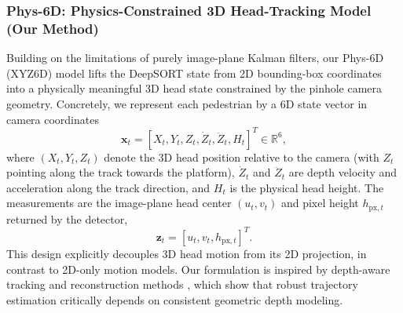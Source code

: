 \subsubsection{Phys-6D: Physics-Constrained 3D Head-Tracking Model (Our Method)}
Building on the limitations of purely image-plane Kalman filters, our Phys-6D (XYZ6D) model lifts the DeepSORT state from 2D bounding-box coordinates into a physically meaningful 3D head state constrained by the pinhole camera geometry. Concretely, we represent each pedestrian by a 6D state vector in camera coordinates
\begin{equation}
\mathbf{x}_t = [X_t, Y_t, Z_t, \dot{Z}_t, \ddot{Z}_t, H_t]^T \in \mathbb{R}^{6},
\end{equation}
where $(X_t, Y_t, Z_t)$ denote the 3D head position relative to the camera (with $Z_t$ pointing along the track towards the platform), $\dot{Z}_t$ and $\ddot{Z}_t$ are depth velocity and acceleration along the track direction, and $H_t$ is the physical head height. The measurements are the image-plane head center $(u_t, v_t)$ and pixel height $h_{\text{px},t}$ returned by the detector,
\begin{equation}
\mathbf{z}_t = [u_t, v_t, h_{\text{px},t}]^T.
\end{equation}
This design explicitly decouples 3D head motion from its 2D projection, in contrast to 2D-only motion models. Our formulation is inspired by depth-aware tracking and reconstruction methods \cite{depth_estimation_2013,structured_light_2023}, which show that robust trajectory estimation critically depends on consistent geometric depth modeling.

